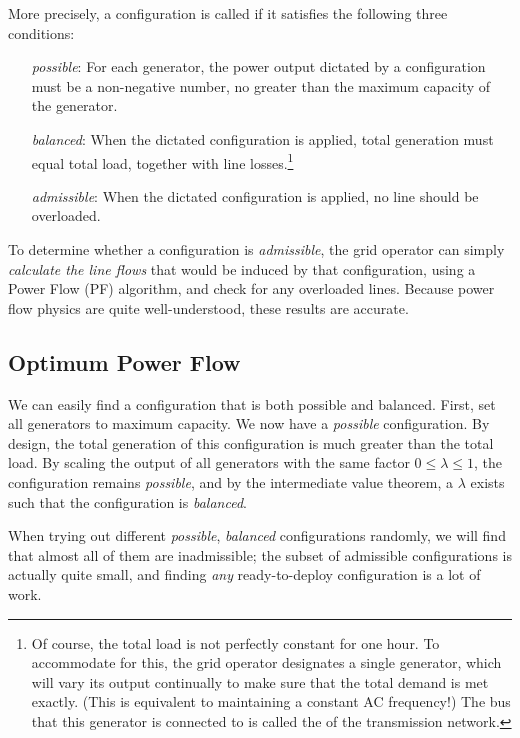 \documentclass[main.tex]{subfiles}
\begin{document}
More precisely, a configuration is called  if it satisfies the following three conditions:
\begin{itemize}[labelwidth =, leftmargin = !]
    \item[\emph{possible}\index{configuration!possible}:] For each generator, the power output dictated by a configuration must be a non-negative number, no greater than the maximum capacity of the generator.
    \item[\emph{balanced}\index{configuration!balanced}:] When the dictated configuration is applied, total generation must equal total load, together with line losses.\footnote{Of course, the total load is not perfectly constant for one hour. To accommodate for this, the grid operator designates a single  generator, which will vary its output continually to make sure that the total demand is met exactly. (This is equivalent to maintaining a constant AC frequency!) The bus that this generator is connected to is called the  of the transmission network.}
    \item[\emph{admissible}\index{configuration!admissible}:] When the dictated configuration is applied, no line should be overloaded.
\end{itemize}

To determine whether a configuration is \emph{admissible}, the grid operator can simply \emph{calculate the line flows} that would be induced by that configuration, using a Power Flow (PF) algorithm, and check for any overloaded lines. Because power flow physics are quite well-understood, these results are accurate.

\subsection{Optimum Power Flow}
We can easily find a configuration that is both {possible} and {balanced}. First, set all generators to maximum capacity. We now have a \emph{possible} configuration. By design, the total generation of this configuration is much greater than the total load. By scaling the output of all generators with the same factor $0 \leq \lambda \leq 1$, the configuration remains \emph{possible}, and by the intermediate value theorem, a $\lambda$ exists such that the configuration is \emph{balanced}.

When trying out different \emph{possible}, \emph{balanced} configurations randomly, we will find that almost all of them are inadmissible; the subset of admissible configurations is actually quite small, and finding \emph{any} ready-to-deploy configuration is a lot of work.
\end{document}
